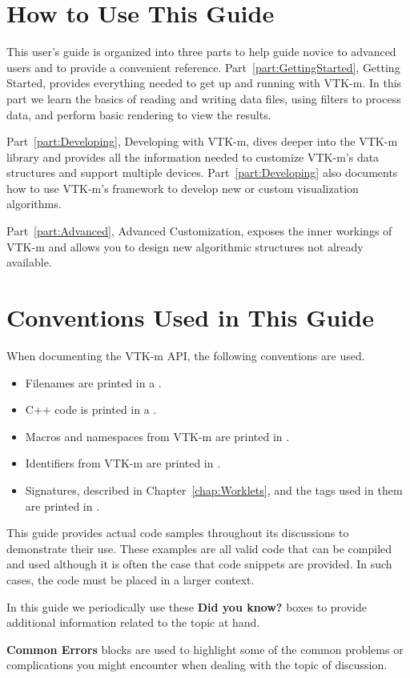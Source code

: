 \section{How to Use This Guide}

This user's guide is organized into three parts to help guide novice to
advanced users and to provide a convenient reference.
Part~\ref{part:GettingStarted}, Getting Started, provides everything needed
to get up and running with VTK-m. In this part we learn the basics of
reading and writing data files, using filters to process data, and perform
basic rendering to view the results.

Part~\ref{part:Developing}, Developing with VTK-m, dives deeper into the
VTK-m library and provides all the information needed to customize VTK-m's
data structures and support multiple devices. Part~\ref{part:Developing}
also documents how to use VTK-m's framework to develop new or custom
visualization algorithms.

Part~\ref{part:Advanced}, Advanced Customization, exposes the inner
workings of VTK-m and allows you to design new algorithmic structures not
already available. 

\section{Conventions Used in This Guide}

When documenting the VTK-m API, the following conventions are used.
\begin{itemize}
\item Filenames are printed in a .
\item C++ code is printed in a .
\item Macros and namespaces from VTK-m are printed in .
\item Identifiers from VTK-m are printed in .
\item Signatures, described in Chapter~\ref{chap:Worklets}, and the
  tags used in them are printed in .
\end{itemize}

This guide provides actual code samples throughout its discussions to
demonstrate their use. These examples are all valid code that can be
compiled and used although it is often the case that code snippets are
provided. In such cases, the code must be placed in a larger context.

\begin{didyouknow}
  In this guide we periodically use these \textbf{Did you know?} boxes to
  provide additional information related to the topic at hand.
\end{didyouknow}

\begin{commonerrors}
  \textbf{Common Errors} blocks are used to highlight some of the common
  problems or complications you might encounter when dealing with the topic
  of discussion.
\end{commonerrors}
